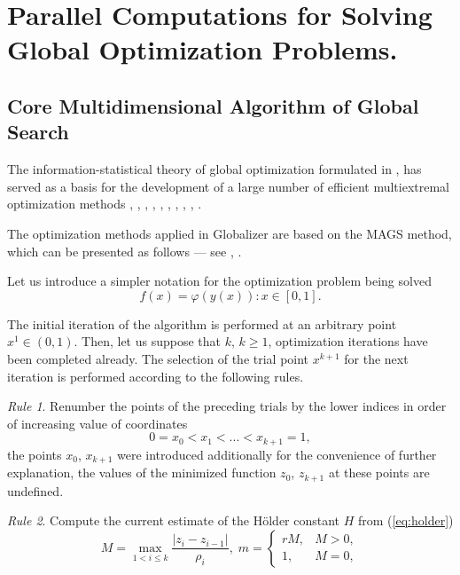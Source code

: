 \documentclass[runningheads]{llncs}
\begin{document}
\section{Parallel Computations for Solving Global Optimization Problems.}
\subsection{Core Multidimensional Algorithm of Global Search}

The information-statistical theory of global optimization formulated in \cite{strongin1978}, \cite{strSergGO} has
served as a basis for the development of a large number of efficient multiextremal optimization
methods \cite{barkalovGergel2014}, \cite{gergel1996}, \cite{gergel1997}, \cite{grishaginStrongin1984}, \cite{Pizzuti}, \cite{sergeyev1995}, \cite{sergeyev1999}, \cite{sergeyevGrishagin2001}, \cite{sergeyevStronginLera2013}, \cite{Famularo2001}.
\par
The optimization methods applied in Globalizer are based on the MAGS method, which can be presented as follows --- see \cite{strongin1978}, \cite{strSergGO}.
\par
Let us introduce a simpler notation for the optimization problem being solved
\begin{equation}
\label{eq:oneDimFunc}
f(x) = \varphi(y(x)):x\in [0,1].
\end{equation}
\par
The initial iteration of the algorithm is performed at an arbitrary point \mbox{\(x^1\in(0,1)\)}.
Then, let us suppose that \(k\), \(k\ge 1\), optimization iterations have been completed already.
The selection of the trial point \(x^{k+1}\) for the next iteration is performed according to the following rules.
\par
\textit{Rule 1}. Renumber the points of the preceding trials by the lower indices in order of increasing value of coordinates
\begin{equation}
  \label{step1}
0=x_0<x_1<...<x_{k+1}=1,
\end{equation}
the points \(x_0\), \(x_{k+1}\) were introduced additionally for the convenience of further
explanation, the values of the minimized function \(z_0\), \(z_{k+1}\) at these points are undefined.
\par
\textit{Rule 2}. Compute the current estimate of the H{\"o}lder constant \(H\) from (\ref{eq:holder})
\begin{equation} \label{step2}
M=\max_{1 < i\leq k}\frac{|z_i-z_{i-1}|}{\rho_i}, \;
m = \left\{
   \begin{array}{lr}
     rM, & M > 0,\\
     1, & M = 0,
   \end{array}
  \right.
\end{equation}
\end{document}
